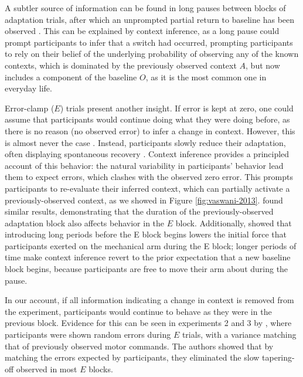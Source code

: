 \documentclass[a4paper,doc,floatsintext,natbib]{apa6}
\def \fref #1{Figure \ref{#1}}     %
\begin{document}
A subtler source of information can be found in long pauses between blocks of adaptation trials, after which an unprompted partial return to baseline has been observed \citep{Ethier_Spontaneous_2008}. This can be explained by context inference, as a long pause could prompt participants to infer that a switch had occurred, prompting participants to rely on their belief of the underlying probability of observing any of the known contexts, which is dominated by the previously observed context $A$, but now includes a component of the baseline $O$, as it is the most common one in everyday life.

Error-clamp ($E$) trials present another insight. If error is kept at zero, one could assume that participants would continue doing what they were doing before, as there is no reason (no observed error) to infer a change in context. However, this is almost never the case \cite[e.g.][]{Smith_Interacting_2006,Ethier_Spontaneous_2008,Forano_Timescales_2020,Vaswani_Decay_2013,Scheidt_Persistence_2000,Pekny_Protection_2011}. Instead, participants slowly reduce their adaptation, often displaying spontaneous recovery \cite[e.g.][]{Smith_Interacting_2006}. Context inference provides a principled account of this behavior: the natural variability in participants' behavior lead them to expect errors, which clashes with the observed zero error. This prompts participants to re-evaluate their inferred context, which can partially activate a previously-observed context, as we showed in \fref{fig:vaswani-2013}. \cite{Pekny_Protection_2011} found similar results, demonstrating that the duration of the previously-observed adaptation block also affects behavior in the $E$ block. Additionally, \cite{Criscimagna-Hemminger_Consolidation_2008} showed that introducing long periods before the E block begins lowers the initial force that participants exerted on the mechanical arm during the E block; longer periods of time make context inference revert to the prior expectation that a new baseline block begins, because participants are free to move their arm about during the pause.

In our account, if all information indicating a change in context is removed from the experiment, participants would continue to behave as they were in the previous block. Evidence for this can be seen in experiments 2 and 3 by \cite{Vaswani_Decay_2013}, where participants were shown random errors during $E$ trials, with a variance matching that of previously observed motor commands. The authors showed that by matching the errors expected by participants, they eliminated the slow tapering-off observed in most $E$ blocks.
\end{document}
